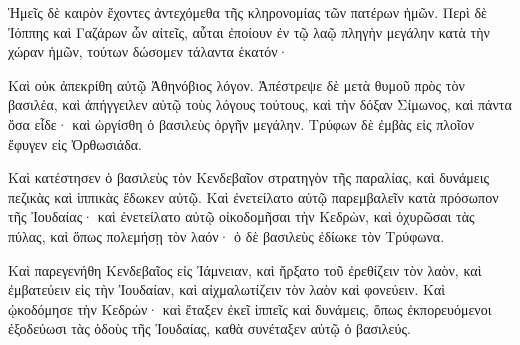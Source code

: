 {Ἡμεῖς δὲ καιρὸν ἔχοντες ἀντεχόμεθα τῆς κληρονομίας τῶν πατέρων ἡμῶν.
Περὶ δὲ Ἰόππης καὶ Γαζάρων ὧν αἰτεῖς, αὗται ἐποίουν ἐν τῷ λαῷ πληγὴν μεγάλην κατὰ τὴν χώραν ἡμῶν, τούτων δώσομεν τάλαντα ἑκατόν·
\par }{\PP {}Καὶ οὐκ ἀπεκρίθη αὐτῷ Ἀθηνόβιος λόγον. Ἀπέστρεψε δὲ μετὰ θυμοῦ πρὸς τὸν βασιλέα, καὶ ἀπήγγειλεν αὐτῷ τοὺς λόγους τούτους, καὶ τὴν δόξαν Σίμωνος, καὶ πάντα ὅσα εἶδε· καὶ ὠργίσθη ὁ βασιλεὺς ὀργῆν μεγάλην.
Τρύφων δὲ ἐμβὰς εἰς πλοῖον ἔφυγεν εἰς Ὀρθωσιάδα.
\par }{\PP {}Καὶ κατέστησεν ὁ βασιλεὺς τὸν Κενδεβαῖον στρατηγὸν τῆς παραλίας, καὶ δυνάμεις πεζικὰς καὶ ἱππικὰς ἔδωκεν αὐτῷ.
Καὶ ἐνετείλατο αὐτῷ παρεμβαλεῖν κατὰ πρόσωπον τῆς Ἰουδαίας· καὶ ἐνετείλατο αὐτῷ οἰκοδομῆσαι τὴν Κεδρὼν, καὶ ὀχυρῶσαι τὰς πύλας, καὶ ὅπως πολεμήσῃ τὸν λαόν· ὁ δὲ βασιλεὺς ἐδίωκε τὸν Τρύφωνα.
\par }{\PP {}Καὶ παρεγενήθη Κενδεβαῖος εἰς Ἰάμνειαν, καὶ ἤρξατο τοῦ ἐρεθίζειν τὸν λαὸν, καὶ ἐμβατεύειν εἰς τὴν Ἰουδαίαν, καὶ αἰχμαλωτίζειν τὸν λαὸν καὶ φονεύειν.
Καὶ ᾠκοδόμησε τὴν Κεδρών· καὶ ἔταξεν ἐκεῖ ἱππεῖς καὶ δυνάμεις, ὅπως ἐκπορευόμενοι ἐξοδεύωσι τὰς ὁδοὺς τῆς Ἰουδαίας, καθὰ συνέταξεν αὐτῷ ὁ βασιλεύς.

}
